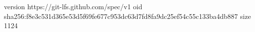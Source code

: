 version https://git-lfs.github.com/spec/v1
oid sha256:f8e3c531d365e53d5f69fe677c953dc63d7fd8fa9dc25ef54c55c133ba4db887
size 1124
